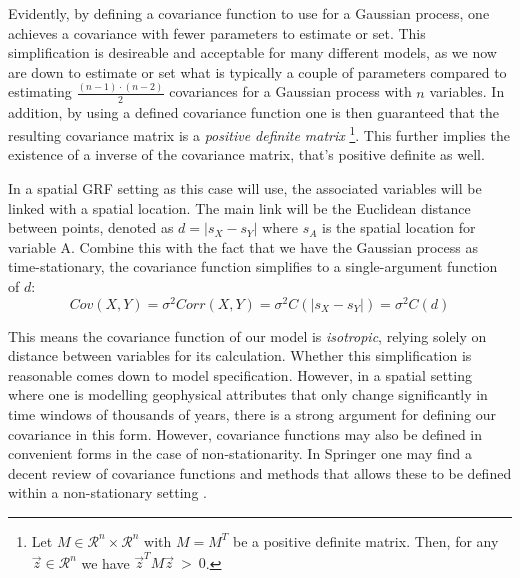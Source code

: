 Evidently, by defining a covariance function to use for a Gaussian process, one achieves a covariance with fewer parameters to estimate or set. This simplification is desireable and acceptable for many different models, as we now are down to estimate or set what is typically a couple of parameters compared to estimating $\frac{(n-1)\cdot(n - 2)}{2}$ covariances for a Gaussian process with $n$ variables. In addition, by using a defined covariance function one is then guaranteed that the resulting covariance matrix is a \textit{positive definite matrix} \footnote{Let $M \in \mathcal{R}^n \times \mathcal{R}^n$ with $M = M^T$ be a positive definite matrix. Then, for any $\vec{z} \in \mathcal{R}^n$ we have $\vec{z}^T M \vec{z} \ > \ 0$.}. This further implies the existence of a inverse of the covariance matrix, that's positive definite as well. 

In a spatial GRF setting as this case will use, the associated variables will be linked with a spatial location. The main link will be the Euclidean distance between points, denoted as $d = |s_X - s_Y|$ where $s_A$ is the spatial location for variable A. Combine this with the fact that we have the Gaussian process as time-stationary, the covariance function simplifies to a single-argument function of $d$:
\begin{equation}
Cov(X, Y) = \sigma^2Corr(X, Y) = \sigma^2C(|s_X - s_Y|) = \sigma^2C(d)
\end{equation}

This means the covariance function of our model is \textit{isotropic}, relying solely on distance between variables for its calculation. Whether this simplification is reasonable comes down to model specification. However, in a spatial setting where one is modelling geophysical attributes that only change significantly in time windows of thousands of years, there is a strong argument for defining our covariance in this form. However, covariance functions may also be defined in convenient forms in the case of non-stationarity. In Springer one may find a decent review of covariance functions and methods that allows these to be defined within a non-stationary setting \cite{LeEtAl}. 


